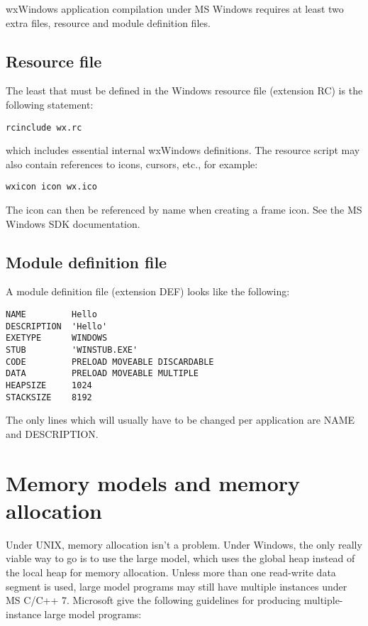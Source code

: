 wxWindows application compilation under MS Windows requires at least two
extra files, resource and module definition files.

\subsection{Resource file}\label{resources}

The least that must be defined in the Windows resource file (extension RC)
is the following statement:

\begin{verbatim}
rcinclude wx.rc
\end{verbatim}

which includes essential internal wxWindows definitions.  The resource script
may also contain references to icons, cursors, etc., for example:

\begin{verbatim}
wxicon icon wx.ico
\end{verbatim}

The icon can then be referenced by name when creating a frame icon. See
the MS Windows SDK documentation.


\subsection{Module definition file}

A module definition file (extension DEF) looks like the following:

\begin{verbatim}
NAME         Hello
DESCRIPTION  'Hello'
EXETYPE      WINDOWS
STUB         'WINSTUB.EXE'
CODE         PRELOAD MOVEABLE DISCARDABLE
DATA         PRELOAD MOVEABLE MULTIPLE
HEAPSIZE     1024
STACKSIZE    8192
\end{verbatim}

The only lines which will usually have to be changed per application are
NAME and DESCRIPTION.

\section{Memory models and memory allocation}\label{memorymodels}

Under UNIX, memory allocation isn't a problem. Under Windows, the only
really viable way to go is to use the large model, which uses the global
heap instead of the local heap for memory allocation. Unless more than
one read-write data segment is used,%
large model programs may still have multiple instances under MS
C/C++ 7. Microsoft give the following guidelines for producing
multiple-instance large model programs:

